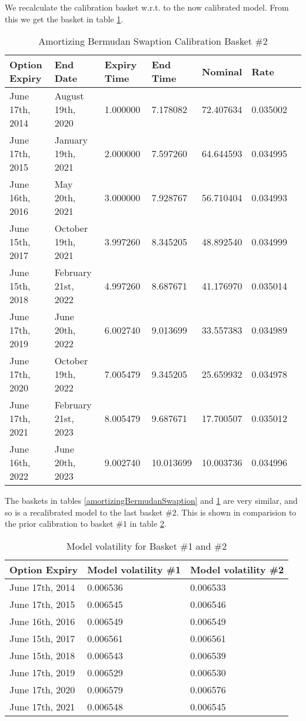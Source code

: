 \documentclass{amsart}
\theoremstyle{plain}
\numberwithin{equation}{section}
\begin{document}
We recalculate the calibration basket w.r.t. to the now calibrated model. From this we get the basket in table \ref{amortizingBermudanSwaption2}.

\begin{table}[ht]
\caption{Amortizing Bermudan Swaption Calibration Basket \#2}
\begin{tabular}{l | l | l | l | l | l | l}
Option Expiry & End Date & Expiry Time & End Time & Nominal & Rate \\ \hline
June 17th, 2014 & August 19th, 2020 & 1.000000 & 7.178082 & 72.407634 & 0.035002 \\
June 17th, 2015 & January 19th, 2021 & 2.000000 & 7.597260 & 64.644593 & 0.034995 \\
June 16th, 2016 & May 20th, 2021 & 3.000000 & 7.928767 & 56.710404 & 0.034993 \\
June 15th, 2017 & October 19th, 2021 & 3.997260 & 8.345205 & 48.892540 & 0.034999 \\
June 15th, 2018 & February 21st, 2022 & 4.997260 & 8.687671 & 41.176970 & 0.035014 \\
June 17th, 2019 & June 20th, 2022 & 6.002740 & 9.013699 & 33.557383 & 0.034989 \\
June 17th, 2020 & October 19th, 2022 & 7.005479 & 9.345205 & 25.659932 & 0.034978 \\
June 17th, 2021 & February 21st, 2023 & 8.005479 & 9.687671 & 17.700507 & 0.035012 \\
June 16th, 2022 & June 20th, 2023 & 9.002740 & 10.013699 & 10.003736 & 0.034996
\end{tabular}
\label{amortizingBermudanSwaption2}
\end{table}

The baskets in tables \ref{amortizingBermudanSwaption} and \ref{amortizingBermudanSwaption2} are very similar, and
so is a recalibrated model to the last basket $\#2$. This is shown in comparision to the prior calibration to basket $\#1$
in table \ref{amortizingBermudanSwaptionModelCal2}.

\begin{table}[ht]
\caption{Model volatility for Basket \#1 and \#2}
\begin{tabular}{l | l | l}
Option Expiry & Model volatility \#1 & Model volatility \#2 \\ \hline
June 17th, 2014 & 0.006536 & 0.006533 \\
June 17th, 2015 & 0.006545 & 0.006546 \\
June 16th, 2016 & 0.006549 & 0.006549 \\
June 15th, 2017 & 0.006561 & 0.006561 \\
June 15th, 2018 & 0.006543 & 0.006539 \\
June 17th, 2019 & 0.006529 & 0.006530 \\
June 17th, 2020 & 0.006579 & 0.006576 \\
June 17th, 2021 & 0.006548 & 0.006545
\end{tabular}
\label{amortizingBermudanSwaptionModelCal2}
\end{table}
\end{document}
